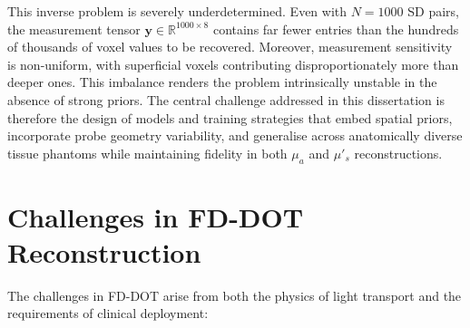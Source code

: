 This inverse problem is severely underdetermined. Even with $N=1000$ SD pairs, the measurement tensor $\mathbf{y} \in \mathbb{R}^{1000 \times 8}$ contains far fewer entries than the hundreds of thousands of voxel values to be recovered. Moreover, measurement sensitivity is non-uniform, with superficial voxels contributing disproportionately more than deeper ones. This imbalance renders the problem intrinsically unstable in the absence of strong priors. The central challenge addressed in this dissertation is therefore the design of models and training strategies that embed spatial priors, incorporate probe geometry variability, and generalise across anatomically diverse tissue phantoms while maintaining fidelity in both $\mu_a$ and $\mu'_s$ reconstructions.


\section{Challenges in FD-DOT Reconstruction}
The challenges in FD-DOT arise from both the physics of light transport and the requirements of clinical deployment:

